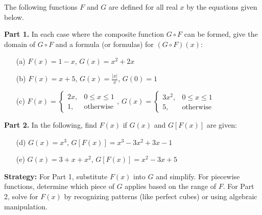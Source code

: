 \begin{problembox}
The following functions \( F \) and \( G \) are defined for all real \( x \) by the equations given below. 

\textbf{Part 1.} In each case where the composite function \( G \circ F \) can be formed, give the domain of \( G \circ F \) and a formula (or formulas) for \( (G \circ F)(x) \):
\begin{itemize}
\item[(a)] \( F(x) = 1 - x \), \quad \( G(x) = x^2 + 2x \)
\item[(b)] \( F(x) = x + 5 \), \quad \( G(x) = \frac{|x|}{x} \), \( G(0) = 1 \)
\item[(c)] \( F(x) = \begin{cases} 2x, & 0 \le x \le 1 \\ 1, & \text{otherwise} \end{cases} \),  
\( G(x) = \begin{cases} 3x^2, & 0 \le x \le 1 \\ 5, & \text{otherwise} \end{cases} \)
\end{itemize}
\textbf{Part 2.} In the following, find \( F(x) \) if \( G(x) \) and \( G[F(x)] \) are given:
\begin{itemize}
\item[(d)] \( G(x) = x^3 \), \quad \( G[F(x)] = x^3 - 3x^2 + 3x - 1 \)
\item[(e)] \( G(x) = 3 + x + x^2 \), \quad \( G[F(x)] = x^2 - 3x + 5 \)
\end{itemize}
\end{problembox}

\noindent\textbf{Strategy:} For Part 1, substitute $F(x)$ into $G$ and simplify. For piecewise functions, determine which piece of $G$ applies based on the range of $F$. For Part 2, solve for $F(x)$ by recognizing patterns (like perfect cubes) or using algebraic manipulation.

